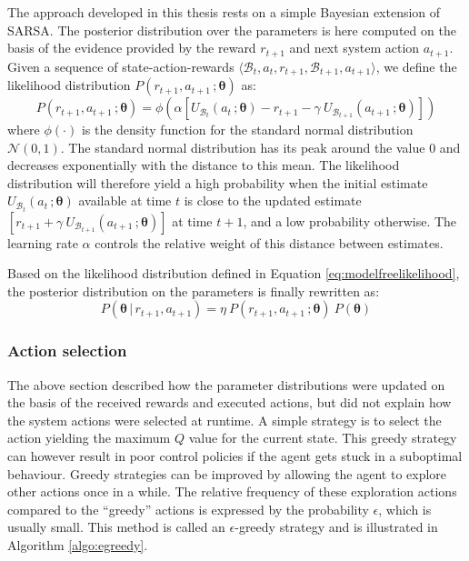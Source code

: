 The approach developed in this thesis rests on a simple Bayesian extension of SARSA.  The posterior distribution over the parameters is here computed on the basis of the evidence provided by the reward $r_{t+1}$ and next system action $a_{t+1}$.  Given a sequence of state-action-rewards $\langle \mathcal{B}_t, a_t, r_{t+1}, \mathcal{B}_{t+1}, a_{t+1} \rangle$, we define the likelihood distribution $P(r_{t+1}, a_{t+1} \,; \boldsymbol\theta)$ as:
\begin{equation}
P(r_{t+1}, a_{t+1} \,; \boldsymbol\theta) = \phi \left(\alpha \left[ U_{\mathcal{B}_t}\left(a_t \,; \boldsymbol\theta\right) - r_{t+1} - \gamma \ U_{\mathcal{B}_{t+1}} \left(a_{t+1} \,; \boldsymbol\theta\right) \right] \right) \label{eq:modelfreelikelihood}
\end{equation}
where $\phi(\cdot)$ is the density function for the standard normal distribution $\mathcal{N}(0, 1)$. The standard normal distribution has its peak around the value 0 and decreases exponentially with the distance to this mean. The likelihood distribution will therefore yield a high probability when the initial estimate 
$U_{\mathcal{B}_t}(a_t \,; \boldsymbol\theta)$ available at time $t$ is close to the updated estimate $\left[r_{t+1} + \gamma \ U_{\mathcal{B}_{t+1}} (a_{t+1} \,; \boldsymbol\theta) \right]$ at time $t+1$, and a low probability otherwise. The learning rate $\alpha$ controls the relative weight of this distance between estimates. 

Based on the likelihood distribution defined in Equation \eqref{eq:modelfreelikelihood}, the posterior distribution on the parameters is finally rewritten as: 
\begin{equation}
P(\boldsymbol\theta \, | \, r_{t+1}, a_{t+1}) = \eta \ P(r_{t+1}, a_{t+1} \,; \boldsymbol\theta)  \ P(\boldsymbol\theta)  \label{eq:posteriormodelfree}
\end{equation}


\subsubsection*{Action selection}

The above section described how the parameter distributions were updated on the basis of the received rewards and executed actions, but did not explain how the system actions were selected at runtime.  A simple strategy is to select the action yielding the maximum $Q$ value for the current state.  This greedy strategy can however result in poor control policies if the agent gets stuck in a suboptimal behaviour.  Greedy strategies can be improved by allowing the agent to explore other actions once in a while. The relative frequency of these exploration actions compared to the  ``greedy'' actions is expressed by the probability $\epsilon$, which is usually small. This method is called an $\epsilon$-greedy strategy and is illustrated in Algorithm \ref{algo:egreedy}.

